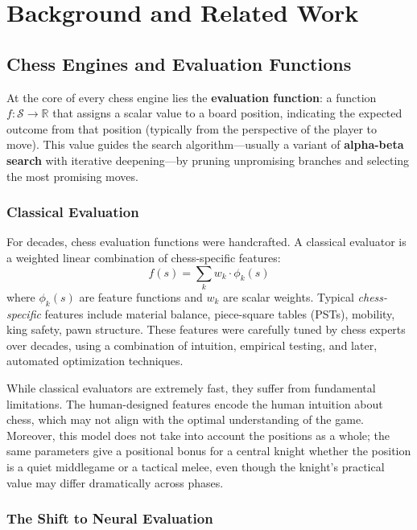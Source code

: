 \chapter{Background and Related Work}\label{ch:background}

\section{Chess Engines and Evaluation Functions}\label{sec:engines}

At the core of every chess engine lies the \textbf{evaluation function}: a function \(f: \mathcal{S} \rightarrow \mathbb{R}\) that assigns a scalar value to a board position, indicating the expected outcome from that position (typically from the perspective of the player to move). This value guides the search algorithm---usually a variant of \textbf{alpha-beta search} with iterative deepening---by pruning unpromising branches and selecting the most promising moves.

\subsection{Classical Evaluation}\label{sec:classical-eval}

For decades, chess evaluation functions were handcrafted. A classical evaluator is a weighted linear combination of chess-specific features:
\[
f(s) = \sum_{k} w_k \cdot \phi_k(s)
\]
where \(\phi_k(s)\) are feature functions and \(w_k\) are scalar weights. Typical \emph{chess-specific} features include material balance, piece-square tables (PSTs), mobility, king safety, pawn structure. These features were carefully tuned by chess experts over decades, using a combination of intuition, empirical testing, and later, automated optimization techniques.

While classical evaluators are extremely fast, they suffer from fundamental limitations. The human-designed features encode the human intuition about chess, which may not align with the optimal understanding of the game. Moreover, this model does not take into account the positions as a whole; the same parameters give a positional bonus for a central knight whether the position is a quiet middlegame or a tactical melee, even though the knight's practical value may differ dramatically across phases.

\subsection{The Shift to Neural Evaluation}\label{sec:neural-eval}

